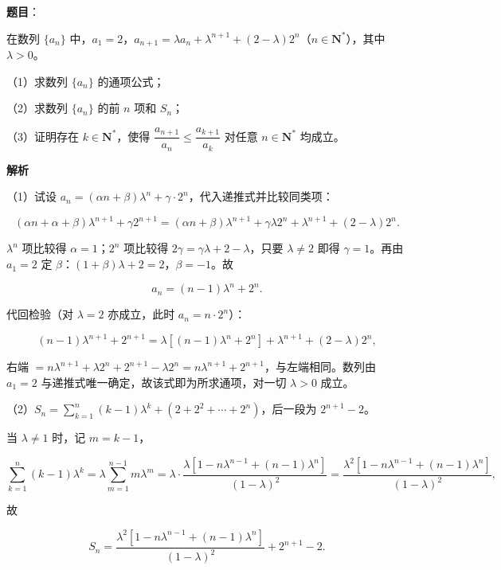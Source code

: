 \begin{answer}

\textbf{题目}：

在数列 $\{a_n\}$ 中，$a_1=2$，$a_{n+1}=\lambda a_n+\lambda^{n+1}+(2-\lambda)2^n$（$n\in\mathbf{N}^*$），其中 $\lambda>0$。

（1）求数列 $\{a_n\}$ 的通项公式；

（2）求数列 $\{a_n\}$ 的前 $n$ 项和 $S_n$；

（3）证明存在 $k\in\mathbf{N}^*$，使得 $\dfrac{a_{n+1}}{a_n}\leqslant\dfrac{a_{k+1}}{a_k}$ 对任意 $n\in\mathbf{N}^*$ 均成立。

\textbf{解析}

（1）试设 $a_n=(\alpha n+\beta)\lambda^n+\gamma\cdot2^n$，代入递推式并比较同类项：

\nopagebreak[4]
\[\left(\alpha n+\alpha+\beta\right)\lambda^{n+1}+\gamma2^{n+1}=\left(\alpha n+\beta\right)\lambda^{n+1}+\gamma\lambda2^n+\lambda^{n+1}+\left(2-\lambda\right)2^n .\]

$\lambda^n$ 项比较得 $\alpha=1$；$2^n$ 项比较得 $2\gamma=\gamma\lambda+2-\lambda$，只要 $\lambda\ne2$ 即得 $\gamma=1$。再由 $a_1=2$ 定 $\beta$：$(1+\beta)\lambda+2=2$，$\beta=-1$。故

\nopagebreak[4]
\[a_n=(n-1)\lambda^n+2^n .\]

代回检验（对 $\lambda=2$ 亦成立，此时 $a_n=n\cdot2^n$）：

\nopagebreak[4]
\[(n-1)\lambda^{n+1}+2^{n+1}=\lambda\left[(n-1)\lambda^n+2^n\right]+\lambda^{n+1}+(2-\lambda)2^n,\]

右端 $=n\lambda^{n+1}+\lambda2^n+2^{n+1}-\lambda2^n=n\lambda^{n+1}+2^{n+1}$，与左端相同。数列由 $a_1=2$ 与递推式唯一确定，故该式即为所求通项，对一切 $\lambda>0$ 成立。

（2）$S_n=\sum_{k=1}^{n}(k-1)\lambda^k+\left(2+2^2+\cdots+2^n\right)$，后一段为 $2^{n+1}-2$。

当 $\lambda\ne1$ 时，记 $m=k-1$，

\nopagebreak[4]
\[\sum_{k=1}^{n}(k-1)\lambda^k=\lambda\sum_{m=1}^{n-1}m\lambda^m=\lambda\cdot\frac{\lambda\left[1-n\lambda^{n-1}+(n-1)\lambda^n\right]}{(1-\lambda)^2}=\frac{\lambda^2\left[1-n\lambda^{n-1}+(n-1)\lambda^n\right]}{(1-\lambda)^2},\]

故

\nopagebreak[4]
\[S_n=\frac{\lambda^2\left[1-n\lambda^{n-1}+(n-1)\lambda^n\right]}{(1-\lambda)^2}+2^{n+1}-2 .\]


\end{answer}
